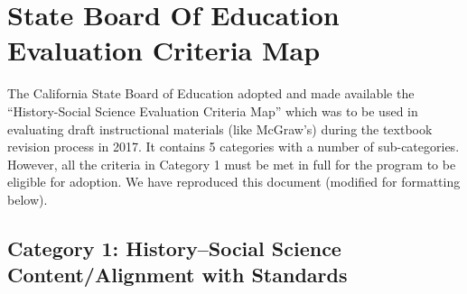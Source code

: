 \chapter{State Board Of Education Evaluation Criteria Map}

The California State Board of Education adopted and made available the “History-Social Science Evaluation Criteria Map” which was to be used in evaluating draft instructional materials (like McGraw’s) during the textbook revision process in 2017. It contains 5 categories with a number of sub-categories. However, all the criteria in Category 1 must be met in full for the program to be eligible for adoption. We have reproduced this document (modified for formatting below).

\section*{Category 1: History–Social Science Content/Alignment with Standards} 

